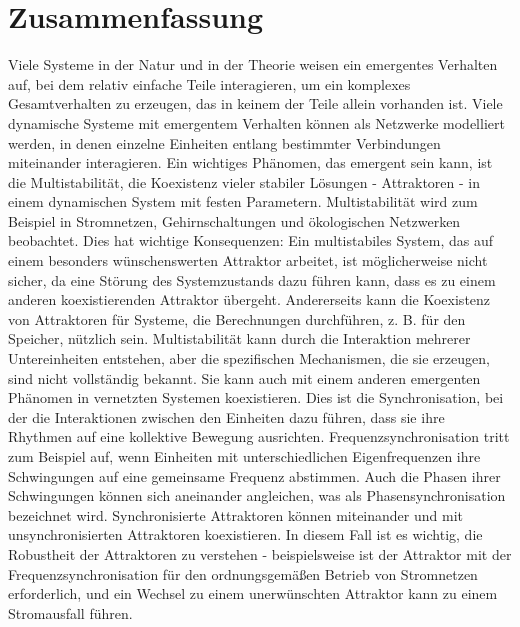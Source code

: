 \section*{Zusammenfassung}

Viele Systeme in der Natur und in der Theorie weisen ein emergentes Verhalten auf, bei dem relativ einfache Teile interagieren, um ein komplexes Gesamtverhalten zu erzeugen, das in keinem der Teile allein vorhanden ist. Viele dynamische Systeme mit emergentem Verhalten können als Netzwerke modelliert werden, in denen einzelne Einheiten entlang bestimmter Verbindungen miteinander interagieren. Ein wichtiges Phänomen, das emergent sein kann, ist die Multistabilität, die Koexistenz vieler stabiler Lösungen - Attraktoren - in einem dynamischen System mit festen Parametern. Multistabilität wird zum Beispiel in Stromnetzen, Gehirnschaltungen und ökologischen Netzwerken beobachtet. Dies hat wichtige Konsequenzen: Ein multistabiles System, das auf einem besonders wünschenswerten Attraktor arbeitet, ist möglicherweise nicht sicher, da eine Störung des Systemzustands dazu führen kann, dass es zu einem anderen koexistierenden Attraktor übergeht. Andererseits kann die Koexistenz von Attraktoren für Systeme, die Berechnungen durchführen, z. B. für den Speicher, nützlich sein. Multistabilität kann durch die Interaktion mehrerer Untereinheiten entstehen, aber die spezifischen Mechanismen, die sie erzeugen, sind nicht vollständig bekannt. Sie kann auch mit einem anderen emergenten Phänomen in vernetzten Systemen koexistieren. Dies ist die Synchronisation, bei der die Interaktionen zwischen den Einheiten dazu führen, dass sie ihre Rhythmen auf eine kollektive Bewegung ausrichten. Frequenzsynchronisation tritt zum Beispiel auf, wenn Einheiten mit unterschiedlichen Eigenfrequenzen ihre Schwingungen auf eine gemeinsame Frequenz abstimmen. Auch die Phasen ihrer Schwingungen können sich aneinander angleichen, was als Phasensynchronisation bezeichnet wird.  Synchronisierte Attraktoren können miteinander und mit unsynchronisierten Attraktoren koexistieren. In diesem Fall ist es wichtig, die Robustheit der Attraktoren zu verstehen - beispielsweise ist der Attraktor mit der Frequenzsynchronisation für den ordnungsgemäßen Betrieb von Stromnetzen erforderlich, und ein Wechsel zu einem unerwünschten Attraktor kann zu einem Stromausfall führen. 


